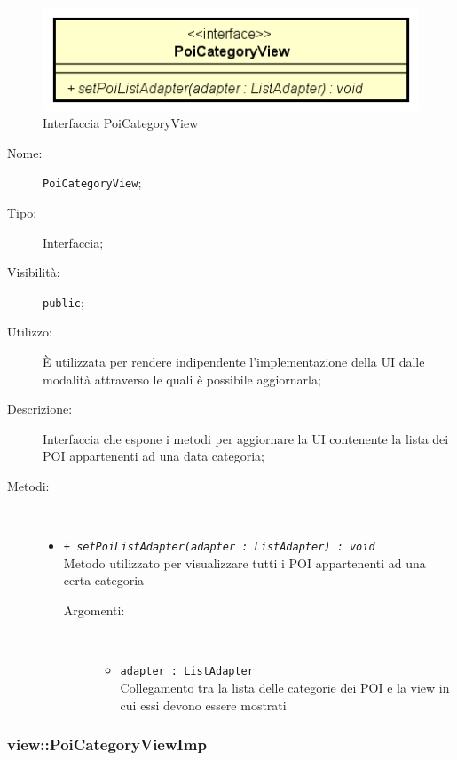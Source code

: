 \documentclass[../DefinizioneDiProdotto.tex]{subfiles}
\begin{document}
    \begin{figure}[H]
        \centering
        \includegraphics{img/PoiCategoryView.png}
        \caption{Interfaccia PoiCategoryView}\label{fig:view::PoiCategoryView} 
    \end{figure}
    \begin{description}
\item[Nome:] \texttt{PoiCategoryView};
\item[Tipo:] Interfaccia;
\item[Visibilità:] \texttt{public};
\item[Utilizzo:] È utilizzata per rendere indipendente l'implementazione della UI dalle modalità attraverso le quali è possibile aggiornarla;
\item[Descrizione:] Interfaccia che espone i metodi per aggiornare la UI contenente la lista dei POI appartenenti ad una data categoria;
\item[Metodi:] \
\begin{itemize}
\item \texttt{+ \textit{setPoiListAdapter(adapter : ListAdapter) : void}}\\
Metodo utilizzato per visualizzare tutti i POI appartenenti ad una certa categoria
 \begin{description}
\item[Argomenti:] \
\begin{itemize}
\item \texttt{adapter : ListAdapter}\\
Collegamento tra la lista delle categorie dei POI e la view in cui essi devono essere mostrati\end{itemize}
\end{description}
\end{itemize}
\end{description}

\subsubsection{view::PoiCategoryViewImp}
\end{document}
